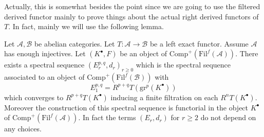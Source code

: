 \medskip\noindent
Actually, this is somewhat besides the point since we are going
to use the filtered derived functor mainly to prove things about
the actual right derived functors of $T$. In fact, mainly we will
use the following lemma.

\begin{lemma}
\label{lemma-ss-filtered-derived}
Let $\mathcal{A}, \mathcal{B}$ be abelian categories.
Let $T : \mathcal{A} \to \mathcal{B}$ be a left exact functor.
Assume $\mathcal{A}$ has enough injectives.
Let $(K^\bullet, F)$ be an object of
$\text{Comp}^{+}(\text{Fil}^f(\mathcal{A}))$.
There exists a spectral sequence $(E_r^{p, q}, d_r)_{r\geq 0}$
which is the spectral sequence
associated to an object of
$\text{Comp}^{+}(\text{Fil}^f(\mathcal{B}))$
with
$$
E_1^{p, q} = R^{p + q}T(\text{gr}^p(K^\bullet))
$$
which converges to $R^{p + q}T(K^\bullet)$ inducing a finite
filtration on each $R^nT(K^\bullet)$. Moreover the construction
of this spectral sequence is functorial in the object
$K^\bullet$ of $\text{Comp}^{+}(\text{Fil}^f(\mathcal{A}))$.
In fact the terms $(E_r, d_r)$ for $r \geq 2$ do not depend
on any choices.
\end{lemma}

